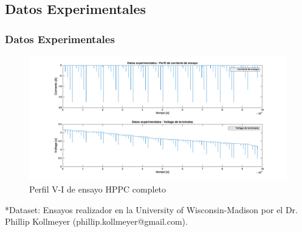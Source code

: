\documentclass[10pt]{beamer}
\theoremstyle{remark}
\theoremstyle{definition}
\begin{document}
\subsection{Datos Experimentales}
\begin{frame}
\frametitle{ Datos Experimentales}

\begin{figure}
	\centering
	\includegraphics[width=1\linewidth]{images/HPPC-Completo}
	\caption{Perfil V-I de ensayo HPPC completo}
	\label{fig:perfildeensayohppc}
\end{figure}


*Dataset: Ensayos realizador en la University of Wisconsin-Madison por el Dr. Phillip Kollmeyer (phillip.kollmeyer@gmail.com). 

\end{frame}
\end{document}
